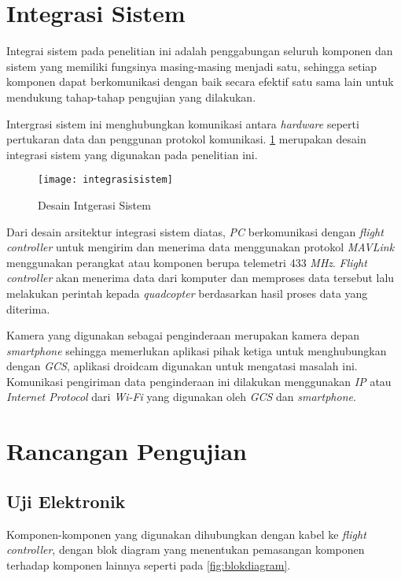 \section{Integrasi Sistem}
Integrai sistem pada penelitian ini adalah penggabungan seluruh komponen dan sistem yang memiliki fungsinya masing-masing menjadi satu, sehingga setiap komponen dapat berkomunikasi dengan baik secara efektif satu sama lain untuk mendukung tahap-tahap pengujian yang dilakukan.

Intergrasi sistem ini menghubungkan komunikasi antara \textit{hardware} seperti pertukaran data dan penggunan protokol komunikasi. \cref{fig:integrasisistem} merupakan desain integrasi sistem yang digunakan pada penelitian ini.

\begin{figure}[H]
	\centering
	\texttt{[image: integrasisistem]}
	\caption{Desain Intgerasi Sistem}
	\label{fig:integrasisistem}
\end{figure}

Dari desain arsitektur integrasi sistem diatas, \textit{PC} berkomunikasi dengan \textit{flight controller} untuk mengirim dan menerima data menggunakan protokol \textit{MAVLink} menggunakan perangkat atau komponen berupa telemetri 433 \textit{MHz}. \textit{Flight controller} akan menerima data dari komputer dan memproses data tersebut lalu melakukan perintah kepada \textit{quadcopter} berdasarkan hasil proses data yang diterima.

Kamera yang digunakan sebagai penginderaan merupakan kamera depan \textit{smartphone} sehingga memerlukan aplikasi pihak ketiga untuk menghubungkan dengan \textit{GCS}, aplikasi droidcam digunakan untuk mengatasi masalah ini. Komunikasi pengiriman data penginderaan ini dilakukan menggunakan \textit{IP} atau \textit{Internet Protocol} dari \textit{Wi-Fi} yang digunakan oleh \textit{GCS} dan \textit{smartphone}.

\section{Rancangan Pengujian}

\subsection{Uji Elektronik}
Komponen-komponen yang digunakan dihubungkan dengan kabel ke \textit{flight controller}, dengan blok diagram yang menentukan pemasangan komponen terhadap komponen lainnya seperti pada \cref{fig:blokdiagram}.

